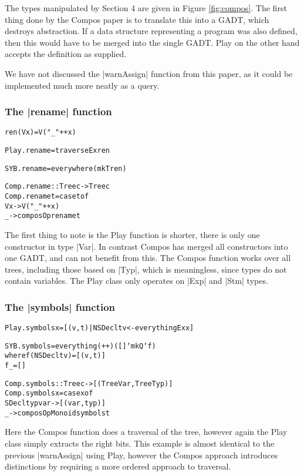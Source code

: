 \documentclass[preprint]{sigplanconf}
\newenvironment{code}{\begin{alltt}\small}{\end{alltt}}
\begin{document}
The types manipulated by Section 4 are given in Figure \ref{fig:compos}. The first thing done by the Compos paper is to translate this into a GADT, which destroys abstraction. If a data structure representing a program was also defined, then this would have to be merged into the single GADT. Play on the other hand accepts the definition as supplied.

We have not discussed the |warnAssign| function from this paper, as it could be implemented much more neatly as a query.

\subsubsection{The |rename| function}

\begin{code} %
ren (V x) = V ("_" ++ x)

Play.rename = traverseEx ren

SYB.rename = everywhere (mkT ren)

Comp.rename :: Tree c -> Tree c
Comp.rename t = case t of
    V x -> V ("_" ++ x)
    _   -> composOp rename t
\end{code}

The first thing to note is the Play function is shorter, there is only one constructor in type |Var|. In contrast Compos has merged all constructors into one GADT, and can not benefit from this. The Compos function works over all trees, including those based on |Typ|, which is meaningless, since types do not contain variables. The Play class only operates on |Exp| and |Stm| types.


\subsubsection{The |symbols| function}

\begin{code}
Play.symbols x = [(v,t) | NSDecl t v <- everythingEx x]

SYB.symbols = everything (++) ([] `mkQ` f)
    where  f (NSDecl t v)  = [(v,t)]
           f _             = []

Comp.symbols :: Tree c -> [(Tree Var, Tree Typ)]
Comp.symbols x = case x of
    SDecl typ var -> [(var,typ)]
    _ -> composOpMonoid symbols t
\end{code}

Here the Compos function does a traversal of the tree, however again the Play class simply extracts the right bits. This example is almost identical to the previous |warnAssign| using Play, however the Compos approach introduces distinctions by requiring a more ordered approach to traversal.
\end{document}
